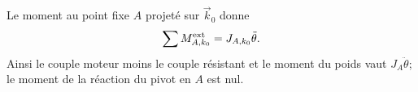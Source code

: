 \begin{corrigebox}
Le moment au point fixe $A$ projeté sur $\vec k_0$ donne
            \[\sum M_{A,k_0}^{\rm ext}=J_{A,k_0}\ddot\theta.\]
            Ainsi le couple moteur moins le couple résistant et le moment du poids vaut
            $J_A\ddot\theta$; le moment de la réaction du pivot en $A$ est nul.
\end{corrigebox}
